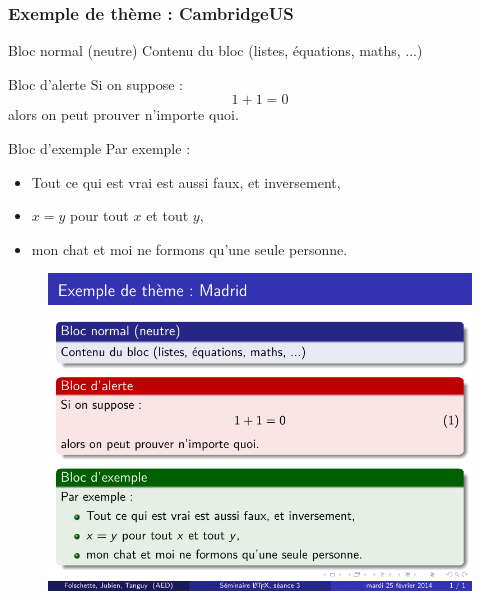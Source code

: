 \begin{frame}[fragile]
  \frametitle{Exemple de thème : CambridgeUS}

\begin{block}{Bloc normal (neutre)}
  Contenu du bloc (listes, équations, maths, ...)
\end{block}

\begin{alertblock}{Bloc d'alerte}
  Si on suppose :
  \begin{equation}
    1+1=0
  \end{equation}
  alors on peut prouver n'importe quoi.
\end{alertblock}

\begin{exampleblock}{Bloc d'exemple}
  Par exemple :
  \begin{itemize}
    \item Tout ce qui est vrai est aussi faux, et inversement,
    \item $x = y$ pour tout $x$ et tout $y$,
    \item mon chat et moi ne formons qu'une seule personne.
  \end{itemize}
\end{exampleblock}
\end{frame}



\begin{frame}[plain]
\begin{figure}
  \centering
  \includegraphics[width=1\textwidth]{img/seance3_extheme_madrid}
\end{figure}
\end{frame}



